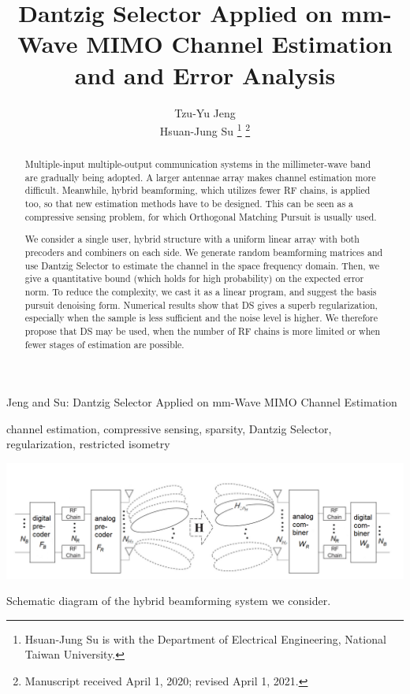 \documentclass[journal]{IEEEtran}
\begin{document}
\title{Dantzig Selector Applied on mm-Wave MIMO Channel Estimation and and Error Analysis}

\author{Tzu-Yu Jeng \\
        Hsuan-Jung Su%
\thanks{Hsuan-Jung Su is with the Department
of Electrical Engineering, National Taiwan University.}
\thanks{Manuscript received April 1, 2020; revised April 1, 2021.}}

%
{Jeng and Su: Dantzig Selector Applied on mm-Wave MIMO Channel Estimation}



\maketitle

\begin{abstract}
Multiple-input multiple-output communication systems in the millimeter-wave band are gradually being adopted.
A larger antennae array makes channel estimation more difficult.
Meanwhile, hybrid beamforming, which utilizes fewer RF chains, is applied too, so that new estimation methods have to be designed.
This can be seen as a compressive sensing problem, for which Orthogonal Matching Pursuit is usually used.

We consider a single user, hybrid structure with a uniform linear array with both precoders and combiners on each side.
We generate random beamforming matrices and use Dantzig Selector to estimate the channel in the space frequency domain.
Then, we give a quantitative bound (which holds for high probability) on the expected error norm.
To reduce the complexity, we cast it as a linear program, and suggest the basis pursuit denoising form.
Numerical results show that DS gives a superb regularization, especially when the sample is less sufficient and the noise level is higher.
We therefore propose that DS may be used, when the number of RF chains is more limited or when fewer stages of estimation are possible.
\end{abstract}

\begin{IEEEkeywords}
channel estimation, compressive sensing, sparsity, Dantzig Selector, regularization, restricted isometry
\end{IEEEkeywords}

\begin {figure*} [!b]
\centering
\includegraphics [width = \textwidth] {system.png}
\caption {Schematic diagram of the hybrid beamforming system we consider.}
\end {figure*}
\end{document}
